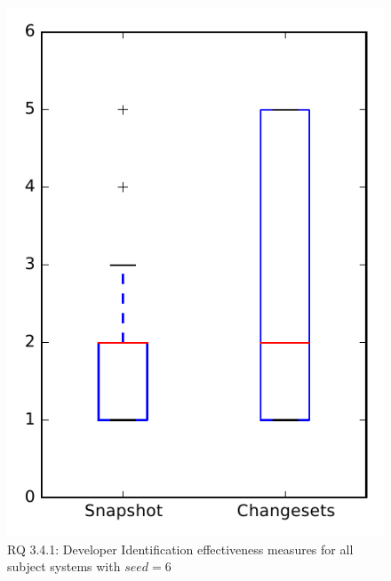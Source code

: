 
\begin{figure}
\centering
\includegraphics[height=0.4\textheight]{figures/dit_seed/rq1_overview_6}
\caption{RQ 3.4.1: Developer Identification effectiveness measures for all subject systems with $seed=6$}
\label{fig:dit_seed:rq1:overview}
\end{figure}
